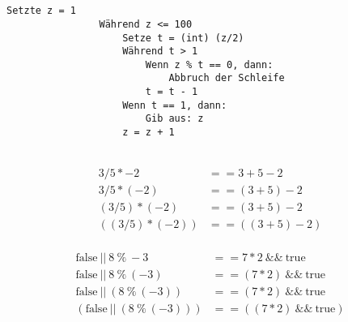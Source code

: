 \documentclass{article}
\begin{document}
    \uebungsblattTitel

    \section*{}
        \subsection{}
            \begin{lstlisting}[autogobble]
                Setzte z = 1
                Während z <= 100
                    Setze t = (int) (z/2)
                    Während t > 1
                        Wenn z % t == 0, dann:
                            Abbruch der Schleife
                        t = t - 1
                    Wenn t == 1, dann:
                        Gib aus: z
                    z = z + 1
            \end{lstlisting}
        \subsection{}
            \begin{align}
                \begin{split}
                    3/5*-2&==3+5-2\\
                    3/5*(-2)&==(3+5)-2\\
                    (3/5)*(-2)&==(3+5)-2\\
                    ((3/5)*(-2))&==((3+5)-2)
                \end{split}
            \end{align}

            \begin{align}
                \begin{split}
                    \text{false}\ ||\ 8\ \%\ -3 &== 7 * 2\ \&\&\ \text{true}\\
                    \text{false}\ ||\ 8\ \%\ (-3) &== (7 * 2)\ \&\&\ \text{true}\\
                    \text{false}\ ||\ (8\ \%\ (-3)) &== (7 * 2)\ \&\&\ \text{true}\\
                    (\text{false}\ ||\ (8\ \%\ (-3))) &== ((7 * 2)\ \&\&\ \text{true})
                \end{split}
            \end{align}
\end{document}
